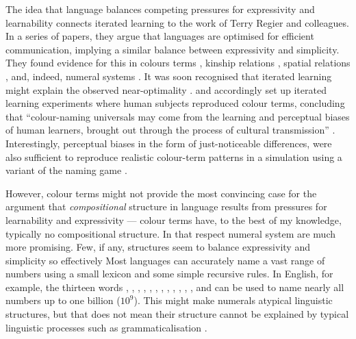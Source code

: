 \documentclass{../src/bcthesispart}
\begin{document}
The idea that language balances competing pressures for expressivity and learnability connects iterated learning to the work of Terry Regier and colleagues.
In a series of papers, they argue that languages are optimised for efficient communication, implying a similar balance between expressivity and simplicity.
They found evidence for this in colours terms \parencite{Regier2007}, kinship relations \parencite{Kemp2012}, spatial relations \parencite{Khetarpal2013,Regier2015}, and, indeed, numeral systems \parencite{Xu2014}.
It was soon recognised that iterated learning might explain the observed near-optimality \parencite{Levinson2012}.
\textcite{Xu2010} and \textcite{Carstensen2015} accordingly set up iterated learning experiments where human subjects reproduced colour terms, concluding that “colour-naming universals may come from the learning and perceptual biases of human learners, brought out through the process of cultural transmission” \parencite{Xu2010}.
Interestingly, perceptual biases in the form of just-noticeable differences, were also sufficient to reproduce realistic colour-term patterns in a simulation using a variant of the naming game \parencite{Baronchelli2010}. 



However, colour terms might not provide the most convincing case for the argument that \emph{compositional} structure in language results from pressures for learnability and expressivity \parencite[e.g.][]{Kirby2015} — colour terms have, to the best of my knowledge, typically no compositional structure.
In that respect numeral system are much more promising. 
Few, if any, structures seem to balance expressivity and simplicity so effectively
Most languages can accurately name a vast range of numbers using a small lexicon and some simple recursive rules. 
In English, for example, the thirteen words , , , , , , , , , , , , and  can be used to name nearly all numbers up to one billion ($10^9$). 
This might make numerals atypical linguistic structures, but that does not mean their structure cannot be explained by typical linguistic processes such as grammaticalisation \parencite{VonMengden2008}.
\end{document}
